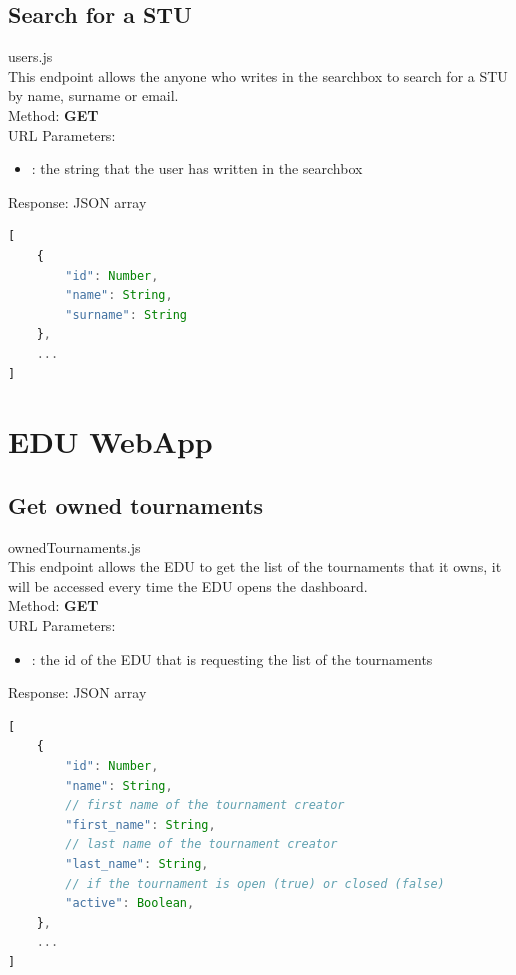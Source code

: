 \subsection{Search for a STU}
users.js\\
This endpoint allows the anyone who writes in the searchbox to search for a STU by name, surname or email.\\

Method: \textbf{GET}\\
URL Parameters:
\begin{itemize}
    \item {}: the string that the user has written in the searchbox
\end{itemize}
Response: JSON array
\begin{lstlisting}[language=JavaScript, label={lst:jscode}, basicstyle=\ttfamily]
[
    {
        "id": Number,
        "name": String,
        "surname": String
    },
    ...
]
\end{lstlisting}

\section*{EDU WebApp}

\subsection{Get owned tournaments}
ownedTournaments.js\\
This endpoint allows the EDU to get the list of the tournaments that it owns, it will be accessed every time the EDU opens the dashboard.\\

Method: \textbf{GET}\\
URL Parameters:
\begin{itemize}
    \item {}: the id of the EDU that is requesting the list of the tournaments
\end{itemize}
Response: JSON array
\begin{lstlisting}[language=JavaScript, label={lst:jscode}, basicstyle=\ttfamily]
[
    {
        "id": Number,
        "name": String,
        // first name of the tournament creator
        "first_name": String, 
        // last name of the tournament creator
        "last_name": String,
        // if the tournament is open (true) or closed (false)
        "active": Boolean,
    },
    ...
]
\end{lstlisting}

